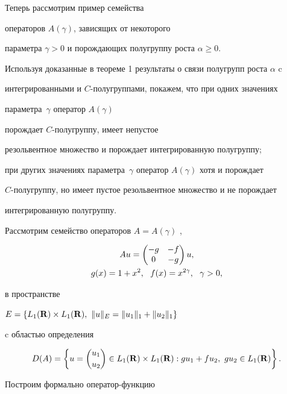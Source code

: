 Теперь рассмотрим пример семейства 


операторов $A(\gamma)$, зависящих от некоторого


параметра $\gamma>0$ и порождающих полугруппу роста $\alpha\geq 0$.


Используя доказанные в теореме 1 результаты о связи полугрупп роста $\alpha$ c


интегрированными и $C$-полугруппами, покажем, что при одних значениях


параметра~$\gamma$ оператор $A(\gamma)$ 


порождает $C$-полугруппу, имеет непустое


резольвентное множество и порождает интегрированную полугруппу;


при других значениях параметра~$\gamma$ оператор $A(\gamma)$ хотя и порождает


$C$-полугруппу, но имеет пустое резольвентное множество и не порождает


интегрированную полугруппу.





Рассмотрим семейство операторов $A=A(\gamma)$ \cite{Davies}, \cite{Melnik}


\begin{gather}\label{mat}


Au =


\begin{pmatrix}


-g & -f \\ 0 & -g


\end{pmatrix}u, \\


%


%


g(x)=1+x^2,\ \ f(x)=x^{2\gamma},\ \ \gamma >0,\notag


\end{gather}


в пространстве


$E=\{L_1(\bold R) \times L_1(\bold R),\ \|u\|_E=\|u_1\|_1+\|u_2\|_1\}$


c областью определения


$$


D(A)=\left\{ u=\binom{u_1}{u_2} \in


L_1(\bold R)\times L_1(\bold R):gu_1+fu_2,\ gu_2 \in L_1(\bold R) \right\}.


$$


Построим формально оператор-функцию


